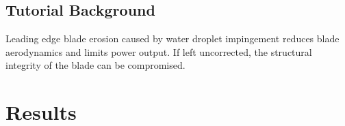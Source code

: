 \documentclass[runningheads]{llncs}
\begin{document}
%
%  
%
%
%  
%
%
%  
%
%
%
%
%
%
%
%
%  
%
\subsection{Tutorial Background} 
Leading edge blade erosion caused by water droplet impingement reduces blade aerodynamics and limits power output. If left uncorrected, the structural integrity of the blade can be compromised. 
  

%
%  
%
%
%  
%
%
%  
%
\section{Results} 
%
%  
%
%
%  
%
\end{document}
